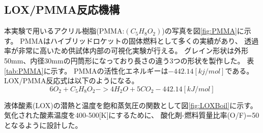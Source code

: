 \subsection{LOX/PMMA反応機構}
本実験で用いるアクリル樹脂(PMMA:$(C_5H_8O_2)$)の写真を図\ref{fig:PMMA}に示す。
PMMAはハイブリッドロケットの固体燃料として多くの実績があり、
透過率が非常に高いため供試体内部の可視化実験が行える。
グレイン形状は外形50mm、内径30mmの円筒形になっており長さの違う3つの形状を製作した。
表\ref{tab:PMMA}に示す。
PMMAの活性化エネルギーは$-442.14[kj/mol]$である。
\\
LOX/PMMA反応式は以下のようになる。
\begin{equation}
6O_2+C_5H_8O_2 -> 4H_2O+5CO_2-442.14[kJ/mol]
\end{equation}

液体酸素(LOX)の潜熱と温度を飽和蒸気圧の関数として図\ref{fig:LOXBoil}に示す。
気化された酸素温度を400-500[K]にするために、
酸化剤-燃料質量比率(O/F)=50となるように設計した。　


